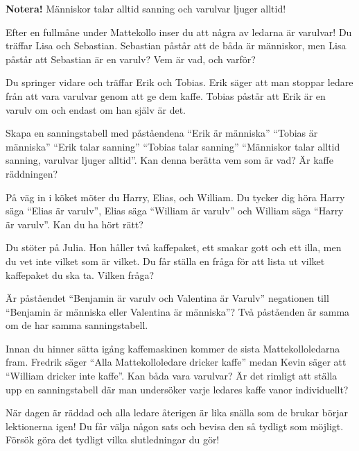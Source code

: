 \noindent
\textbf{Notera!}  Människor talar alltid sanning och varulvar ljuger alltid!

\begin{problem}
	Efter en fullmåne under Mattekollo inser du att några av ledarna är varulvar! Du träffar Lisa och Sebastian. Sebastian påstår att de båda är människor, men Lisa påstår att Sebastian är en varulv? Vem är vad, och varför?
\end{problem}

\begin{problem}
	Du springer vidare och träffar Erik och Tobias. Erik säger att man stoppar ledare från att vara varulvar genom att ge dem kaffe. Tobias påstår att Erik är en varulv om och endast om han själv är det.

	Skapa en sanningstabell med påståendena ``Erik är människa'' ``Tobias är människa'' ``Erik talar sanning'' ``Tobias talar sanning'' ``Människor talar alltid sanning, varulvar ljuger alltid''. Kan denna berätta vem som är vad? Är kaffe räddningen?
\end{problem}

\begin{problem}
	På väg in i köket möter du Harry, Elias, och William. Du tycker dig höra Harry säga ``Elias är varulv'', Elias säga ``William är varulv'' och William säga ``Harry är varulv''. Kan du ha hört rätt?
\end{problem}

\begin{problem}[Extra]
	Du stöter på Julia. Hon håller två kaffepaket, ett smakar gott och ett illa, men du vet inte vilket som är vilket. Du får ställa en fråga för att lista ut vilket kaffepaket du ska ta. Vilken fråga?
\end{problem}

\begin{problem}
	Är påståendet ``Benjamin är varulv och Valentina är Varulv'' negationen till ``Benjamin är människa eller Valentina är människa''? Två påståenden är samma om de har samma sanningstabell.
\end{problem}

\begin{problem}
	Innan du hinner sätta igång kaffemaskinen kommer de sista Mattekolloledarna fram. Fredrik säger ``Alla Mattekolloledare dricker kaffe'' medan Kevin säger att ``William dricker inte kaffe''. Kan båda vara varulvar? Är det rimligt att ställa upp en sanningstabell där man undersöker varje ledares kaffe vanor individuellt?
\end{problem}

\begin{problem}[Extra]
	När dagen är räddad och alla ledare återigen är lika snälla som de brukar börjar lektionerna igen! Du får välja någon sats och bevisa den så tydligt som möjligt. Försök göra det tydligt vilka slutledningar du gör!
\end{problem}
